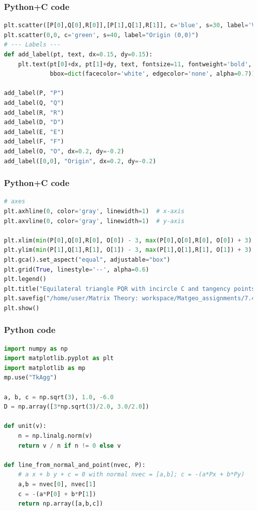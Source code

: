 \documentclass{beamer}
\begin{document}
\begin{frame}[fragile]
    \frametitle{Python+C code}
    \begin{lstlisting}[language=Python]
plt.scatter([P[0],Q[0],R[0]],[P[1],Q[1],R[1]], c='blue', s=30, label='Vertices P,Q,R')
plt.scatter(0,0, c='green', s=40, label="Origin (0,0)")
# --- Labels ---
def add_label(pt, text, dx=0.15, dy=0.15):
    plt.text(pt[0]+dx, pt[1]+dy, text, fontsize=11, fontweight='bold',
             bbox=dict(facecolor='white', edgecolor='none', alpha=0.7))

add_label(P, "P")
add_label(Q, "Q")
add_label(R, "R")
add_label(D, "D")
add_label(E, "E")
add_label(F, "F")
add_label(O, "O", dx=0.2, dy=-0.2)
add_label([0,0], "Origin", dx=0.2, dy=-0.2)


    \end{lstlisting}   
\end{frame}
\begin{frame}[fragile]
    \frametitle{Python+C code}
    \begin{lstlisting}[language=Python]
# axes
plt.axhline(0, color='gray', linewidth=1)  # x-axis
plt.axvline(0, color='gray', linewidth=1)  # y-axis

plt.xlim(min(P[0],Q[0],R[0], O[0]) - 3, max(P[0],Q[0],R[0], O[0]) + 3)
plt.ylim(min(P[1],Q[1],R[1], O[1]) - 3, max(P[1],Q[1],R[1], O[1]) + 3)
plt.gca().set_aspect("equal", adjustable="box")
plt.grid(True, linestyle='--', alpha=0.6)
plt.legend()
plt.title("Equilateral triangle PQR with incircle C and tangency points D,E,F")
plt.savefig("/home/user/Matrix Theory: workspace/Matgeo_assignments/7.4.33/figs/figure_1.png")
plt.show()
    \end{lstlisting}   
\end{frame}

\begin{frame}[fragile]
    \frametitle{Python code}
    \begin{lstlisting}[language=Python]
import numpy as np
import matplotlib.pyplot as plt
import matplotlib as mp 
mp.use("TkAgg")

a, b, c = np.sqrt(3), 1.0, -6.0           
D = np.array([3*np.sqrt(3)/2.0, 3.0/2.0]) 

def unit(v):
    n = np.linalg.norm(v)
    return v / n if n != 0 else v

def line_from_normal_and_point(nvec, P):
    # a x + b y + c = 0 with normal nvec = [a,b]; c = -(a*Px + b*Py)
    a,b = nvec[0], nvec[1]
    c = -(a*P[0] + b*P[1])
    return np.array([a,b,c])

    \end{lstlisting}   
\end{frame}
\end{document}
